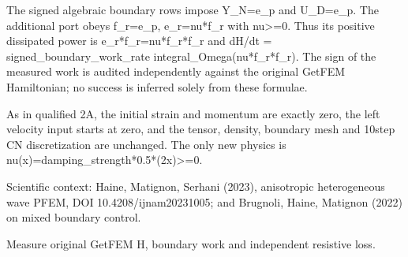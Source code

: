 \documentclass[letterpaper,10pt,english]{sphinxmanual}
\begin{document}
\sphinxAtStartPar
The signed algebraic boundary rows impose Y\_N=e\_p and U\_D=e\_p.
The additional port obeys f\_r=\sphinxhyphen{}e\_p, e\_r=nu*f\_r with nu\textgreater{}=0.
Thus its positive dissipated power is e\_r*f\_r=nu*f\_r*f\_r and
dH/dt = signed\_boundary\_work\_rate \sphinxhyphen{} integral\_Omega(nu*f\_r*f\_r).
The  sign of the measured work is audited independently
against the original GetFEM Hamiltonian; no success is inferred
solely from these formulae.

\sphinxAtStartPar
As in qualified 2A, the initial strain and momentum are exactly zero,
the left velocity input starts at zero, and the tensor, density,
boundary mesh and 10\sphinxhyphen{}step CN discretization are unchanged.
The only new physics is nu(x)=damping\_strength*0.5*(2\sphinxhyphen{}x)\textgreater{}=0.

\sphinxAtStartPar
Scientific context: Haine, Matignon, Serhani (2023), anisotropic
heterogeneous wave PFEM, DOI 10.4208/ijnam2023\sphinxhyphen{}1005; and
Brugnoli, Haine, Matignon (2022) on mixed boundary control.

\begin{fulllineitems}
\label{\detokenize{examples/wave:examples.wave_dissipative.main}}
\pysigstartsignatures
\pysiglinewithargsret
{}
{}
{}
\pysigstopsignatures
\end{fulllineitems}


\begin{fulllineitems}
\label{\detokenize{examples/wave:examples.wave_dissipative.measure_wave_2d}}
\pysigstartsignatures
\pysiglinewithargsret
{}
{}
{}
\pysigstopsignatures
\sphinxAtStartPar
Measure original GetFEM H, boundary work and independent resistive loss.

\end{fulllineitems}

\end{document}
